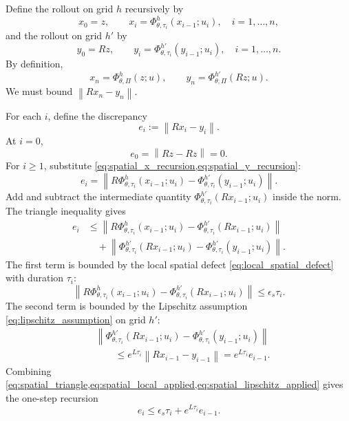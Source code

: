 \documentclass{article}
\theoremstyle{plain}
\theoremstyle{definition}
\theoremstyle{remark}
\newcommand{\PhiOp}{\Phi}
\newcommand{\norm}[1]{\left\lVert #1 \right\rVert}
\begin{document}
Define the rollout on grid $h$ recursively by
\begin{equation}
x_0=z,
\qquad
x_i=\PhiOp^{h}_{\theta,\tau_i}(x_{i-1};u_i),
\quad i=1,\ldots,n,
\label{eq:spatial_x_recursion}
\end{equation}
and the rollout on grid $h'$ by
\begin{equation}
y_0=Rz,
\qquad
y_i=\PhiOp^{h'}_{\theta,\tau_i}(y_{i-1};u_i),
\quad i=1,\ldots,n.
\label{eq:spatial_y_recursion}
\end{equation}
By definition,
\begin{equation}
x_n=\PhiOp^{h}_{\theta,\Pi}(z;u),
\qquad
y_n=\PhiOp^{h'}_{\theta,\Pi}(Rz;u).
\end{equation}
We must bound $\norm{Rx_n-y_n}$.

For each $i$, define the discrepancy
\begin{equation}
e_i:=\norm{Rx_i-y_i}.
\end{equation}
At $i=0$,
\begin{equation}
e_0=\norm{Rz-Rz}=0.
\label{eq:spatial_e0}
\end{equation}
For $i\ge1$, substitute \cref{eq:spatial_x_recursion,eq:spatial_y_recursion}:
\begin{equation}
e_i
=
\norm{
R\PhiOp^{h}_{\theta,\tau_i}(x_{i-1};u_i)
-
\PhiOp^{h'}_{\theta,\tau_i}(y_{i-1};u_i)
}.
\end{equation}
Add and subtract the intermediate quantity
$\PhiOp^{h'}_{\theta,\tau_i}(Rx_{i-1};u_i)$ inside the norm. The triangle inequality gives
\begin{align}
e_i
&\le
\norm{
R\PhiOp^{h}_{\theta,\tau_i}(x_{i-1};u_i)
-
\PhiOp^{h'}_{\theta,\tau_i}(Rx_{i-1};u_i)
}
\nonumber\\
&\quad+
\norm{
\PhiOp^{h'}_{\theta,\tau_i}(Rx_{i-1};u_i)
-
\PhiOp^{h'}_{\theta,\tau_i}(y_{i-1};u_i)
}.
\label{eq:spatial_triangle}
\end{align}
The first term is bounded by the local spatial defect \cref{eq:local_spatial_defect} with duration $\tau_i$:
\begin{equation}
\norm{
R\PhiOp^{h}_{\theta,\tau_i}(x_{i-1};u_i)
-
\PhiOp^{h'}_{\theta,\tau_i}(Rx_{i-1};u_i)
}
\le \epsilon_s\tau_i.
\label{eq:spatial_local_applied}
\end{equation}
The second term is bounded by the Lipschitz assumption \cref{eq:lipschitz_assumption} on grid $h'$:
\begin{align}
&\norm{
\PhiOp^{h'}_{\theta,\tau_i}(Rx_{i-1};u_i)
-
\PhiOp^{h'}_{\theta,\tau_i}(y_{i-1};u_i)
}
\nonumber\\
&\qquad\le
e^{L\tau_i}\norm{Rx_{i-1}-y_{i-1}}
=e^{L\tau_i}e_{i-1}.
\label{eq:spatial_lipschitz_applied}
\end{align}
Combining \cref{eq:spatial_triangle,eq:spatial_local_applied,eq:spatial_lipschitz_applied} gives the one-step recursion
\begin{equation}
e_i\le \epsilon_s\tau_i+e^{L\tau_i}e_{i-1}.
\label{eq:spatial_recursion}
\end{equation}
\end{document}
